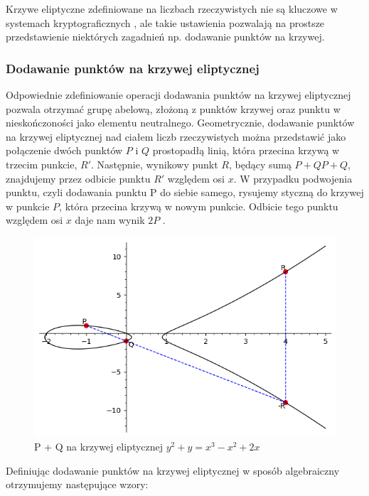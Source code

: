 Krzywe eliptyczne zdefiniowane na liczbach rzeczywistych nie są kluczowe w
systemach kryptograficznych \cite*{Stinson2021}, ale takie ustawienia
pozwalają na prostsze przedstawienie niektórych zagadnień
np. dodawanie punktów na krzywej.


\subsubsection{Dodawanie punktów na krzywej eliptycznej}
Odpowiednie zdefiniowanie operacji dodawania punktów na krzywej eliptycznej
pozwala otrzymać grupę abelową, złożoną z punktów krzywej oraz punktu w nieskończoności jako
elementu neutralnego.
\newline
\indent
Geometrycznie, dodawanie punktów na krzywej eliptycznej nad ciałem liczb rzeczywistych można przedstawić
jako połączenie dwóch punktów $P$ i $Q$ prostopadłą linią, która przecina krzywą w trzecim
punkcie, $R'$. Następnie, wynikowy punkt $R$, będący sumą $P+QP+Q$, znajdujemy przez
odbicie punktu $R'$ względem osi $x$. W przypadku podwojenia punktu, czyli dodawania
punktu P do siebie samego, rysujemy styczną do krzywej w punkcie $P$, która przecina
krzywą w nowym punkcie. Odbicie tego punktu względem osi $x$ daje nam wynik $2P$ \cite{Algorytmy}\cite{Stinson2021}.
\begin{figure}[!h]
    \centering \includegraphics[width=0.8\linewidth]{sage/elliptic_rational_point_addition.png}
    \caption{P + Q na krzywej eliptycznej $y^2+y=x^3-x^2+2x$}
\end{figure}
\par
Definiując dodawanie punktów na krzywej eliptycznej w sposób algebraiczny otrzymujemy następujące wzory:
